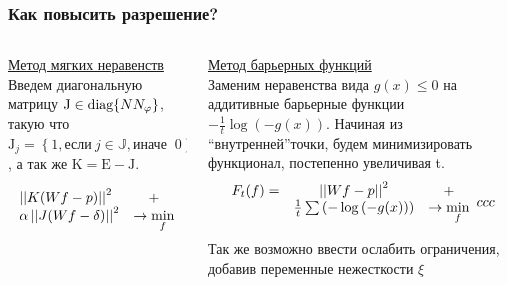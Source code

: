 \documentclass[12pt]{beamer}
\begin{document}
\begingroup
\small
\begin{frame}
  \frametitle{Как повысить разрешение?}
  \begin{columns}[T, onlytextwidth]
  \hspace{-0.5cm}
  \begin{column}{0.5\textwidth}
    \underline{Метод мягких неравенств} \\ \vspace{0.5cm}
    Введем диагональную матрицу $\mathrm J \in \textup{diag}\{N N_\varphi\}$, такую что 
    $\mathrm J_{j} = \left\{1, \mbox{если}\ j \in \mathbb J, \mbox{иначе }\ 0\right\}$, а так же $\mathrm K = \mathrm E - \mathrm J$.


    \begin{equation} \notag
      \label{eq:soft-ineq}
      \begin{array}{lc}
      \left|\left| K(Wf - p) \right|\right|^2 & + \\
      \alpha \left|\left| J(Wf - \delta) \right|\right|^2  & \to \min\limits_f
      \end{array}
    \end{equation}
  \end{column}

  \begin{column}{0.5\textwidth}
    \underline{Метод барьерных функций} \\ \vspace{0.5cm}
    Заменим неравенства вида $g(x) \leq 0$ на аддитивные барьерные функции $-\frac 1 t \log{\left(-g(x)\right)}$.
    Начиная из ``внутренней''точки, будем минимизировать функционал, постепенно увеличивая t.
    $$
    \begin{array}{ccc}
      F_t(f) = & \left|\left| Wf - p \right|\right|^2 & + \\
              & \frac 1 t \sum \left( -\log{\left(-g(x)\right)} \right) &\to \min\limits_f
    \end{array}{ccc}
    $$

    Так же возможно ввести ослабить ограничения, добавив переменные нежесткости $\xi$

  \end{column}
  \end{columns}
\end{frame}
\endgroup
\end{document}
